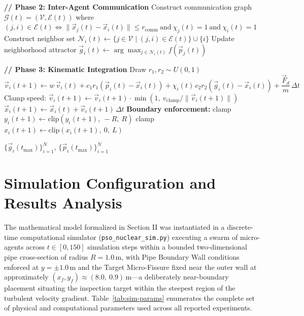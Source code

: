 \documentclass[journal]{IEEEtran}
\begin{document}
\begin{algorithm}[t]
\begin{algorithmic}[1]
    \State \textbf{// Phase 2: Inter-Agent Communication}
    \State Construct communication graph $\mathcal{G}(t) = (\mathcal{V}, \mathcal{E}(t))$ where $(j,i) \in \mathcal{E}(t) \iff \|\vec{x}_j(t) - \vec{x}_i(t)\| \le r_{\text{comm}} \ \text{and}\ \chi_j(t) = 1 \ \text{and}\ \chi_i(t) = 1$
        \State Construct neighbor set $\mathcal{N}_i(t) \leftarrow \{j \in \mathcal{V} \mid (j,i) \in \mathcal{E}(t)\} \cup \{i\}$
        \State Update neighborhood attractor $\vec{g}_i(t) \leftarrow \displaystyle\arg\max_{j \in \mathcal{N}_i(t)} f(\vec{p}_j(t))$
    \EndFor

    \State \textbf{// Phase 3: Kinematic Integration}
        \State Draw $r_1, r_2 \sim U(0,1)$
        \State $\vec{v}_i(t+1) \leftarrow w\,\vec{v}_i(t) + c_1 r_1 (\vec{p}_i(t) - \vec{x}_i(t)) + \chi_i(t)\, c_2 r_2 (\vec{g}_i(t) - \vec{x}_i(t)) + \dfrac{\vec{F}_d}{m}\,\Delta t$
        \State Clamp speed: $\vec{v}_i(t+1) \leftarrow \vec{v}_i(t+1) \cdot \min\!\left(1,\ v_{\text{clamp}} / \|\vec{v}_i(t+1)\|\right)$
        \State $\vec{x}_i(t+1) \leftarrow \vec{x}_i(t) + \vec{v}_i(t+1)\,\Delta t$
        \State \textbf{Boundary enforcement:} clamp $y_i(t+1) \leftarrow \text{clip}(y_i(t+1),\ -R,\ R)$
        \State \hspace{4.2em} clamp $x_i(t+1) \leftarrow \text{clip}(x_i(t+1),\ 0,\ L)$
    \EndFor
\EndFor

\Return $\{\vec{g}_i(t_{\max})\}_{i=1}^{N}$, $\{\vec{p}_i(t_{\max})\}_{i=1}^{N}$
\end{algorithmic}
\end{algorithm}

\section{Simulation Configuration and Results Analysis}
\label{sec:simulation}

The mathematical model formalized in Section II was instantiated in a discrete-time computational simulator (\texttt{pso\_nuclear\_sim.py}) executing a swarm of micro-agents across $t \in [0, 150]$ simulation steps within a bounded two-dimensional pipe cross-section of radius $R = 1.0\,\text{m}$, with Pipe Boundary Wall conditions enforced at $y = \pm 1.0\,\text{m}$ and the Target Micro-Fissure fixed near the outer wall at approximately $(x_f, y_f) \approx (8.0,\ 0.9)\,\text{m}$---a deliberately near-boundary placement situating the inspection target within the steepest region of the turbulent velocity gradient. Table~\ref{tab:sim-params} enumerates the complete set of physical and computational parameters used across all reported experiments.
\end{document}
